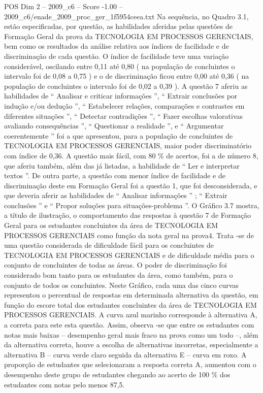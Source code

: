 \begin{textsample}{POS Dim 2 – 2009\_c6 – Score -1.00 – 2009\_c6/enade\_2009\_proc\_ger\_1f5954ceea.txt}
Na sequência, no Quadro 3.1, estão especificadas, por questão, as habilidades aferidas pelas questões de Formação Geral da prova da TECNOLOGIA EM PROCESSOS GERENCIAIS, bem como os resultados da análise relativa aos índices de facilidade e de discriminação de cada questão.
O índice de facilidade teve uma variação considerável, oscilando entre 0,11 até 0,80 ( na população de concluintes o intervalo foi de 0,08 a 0,75 ) e o de discriminação ficou entre 0,00 até 0,36 ( na população de concluintes o intervalo foi de 0,02 a 0,39 ).
A questão 7 aferiu as habilidades de “ Analisar e criticar informações ”, “ Extrair conclusões por indução e/ou dedução ”, “ Estabelecer relações, comparações e contrastes em diferentes situações ”, “ Detectar contradições ”, “ Fazer escolhas valorativas avaliando consequências ”, “ Questionar a realidade ”, e “ Argumentar coerentemente ” foi a que apresentou, para a população de concluintes de TECNOLOGIA EM PROCESSOS GERENCIAIS, maior poder discriminatório com índice de 0,36.
A questão mais fácil, com 80 \% de acertos, foi a de número 8, que aferiu também, além das já listadas, a habilidade de “ Ler e interpretar textos ”.
De outra parte, a questão com menor índice de facilidade e de discriminação deste em Formação Geral foi a questão 1, que foi desconsiderada, e que deveria aferir as habilidades de “ Analisar informações ” ; “ Extrair conclusões ” e “ Propor soluções para situações-problema ”.
O Gráfico 3.7 mostra, a título de ilustração, o comportamento das respostas à questão 7 de Formação Geral para os estudantes concluintes da área de TECNOLOGIA EM PROCESSOS GERENCIAIS como função da nota geral na prova4.
Trata -se de uma questão considerada de dificuldade fácil para os concluintes de TECNOLOGIA EM PROCESSOS GERENCIAIS e de dificuldade média para o conjunto de concluintes de todas as áreas.
O poder de discriminação foi considerado bom tanto para os estudantes da área, como também, para o conjunto de todos os concluintes.
Neste Gráfico, cada uma das cinco curvas representou o percentual de respostas em determinada alternativa da questão, em função do escore total dos estudantes concluintes da área de TECNOLOGIA EM PROCESSOS GERENCIAIS.
A curva azul marinho corresponde à alternativa A, a correta para este esta questão.
Assim, observa -se que entre os estudantes com notas mais baixas – desempenho geral mais fraco na prova como um todo –, além da alternativa correta, houve a escolha de alternativas incorretas, especialmente a alternativa B – curva verde claro seguida da alternativa E – curva em roxo.
A proporção de estudantes que selecionaram a resposta correta A, aumentou com o desempenho deste grupo de estudantes chegando ao acerto de 100 \% dos estudantes com notas pelo menos 87,5.

\end{textsample}
